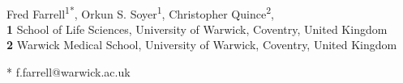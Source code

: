 \documentclass[10pt,letterpaper]{article}
\date{}
\begin{document}
\vspace*{0.2in}

\begin{flushleft}
{\Large
\textbf{} %
}
\newline
\\
Fred Farrell\textsuperscript{1*},
Orkun S. Soyer\textsuperscript{1},
Christopher Quince\textsuperscript{2},
\\
\bigskip
\textbf{1} School of Life Sciences, University of Warwick, Coventry, United Kingdom
\\\textbf{2} Warwick Medical School, University of Warwick, Coventry, United Kingdom
\\
\bigskip

% 
%





* f.farrell@warwick.ac.uk

\end{flushleft}
\end{document}
